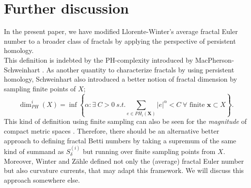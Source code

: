 \documentclass[12pt]{amsart}
\numberwithin{equation}{section}
\begin{document}
\section{Further discussion}
In the present paper, we have modified Llorente-Winter's average fractal Euler number to a broader class of fractals by applying the perspective of persistent homology. \\
\indent
This definition is indebted by the PH-complexity introduced by MacPherson-Schweinhart \cite{MS12}. 
As another quantity to characterize fractals by using persistent homology, Schweinhart\cite{S21} also introduced a better notion of fractal dimension by sampling finite points of $X$; 
\begin{equation*}
    \dim_{PH}^i (X) = \inf \left\{ \alpha \colon \exists \  C >0 \ s.t. \sum_{e\in PH_i (\mathbf{X})} |e|^\alpha < C \ \forall \text{ finite } \mathbf{x} \subset X\right\}. 
\end{equation*}
This kind of definition using finite sampling can also be seen for the {\em magnitude} of compact metric spaces \cite{LM17}. 
Therefore, there should be an alternative better approach to defining fractal Betti numbers by taking a supremum of the same kind of summand as $S_\delta^{(i)}$ but running over finite sampling points from $X$. 
Moreover, Winter and Z\"{a}hle \cite{W06, WZ13} defined not only the (average) fractal Euler number but also curvature currents, that may adapt this framework. 
We will discuss this approach somewhere else. 
\end{document}
